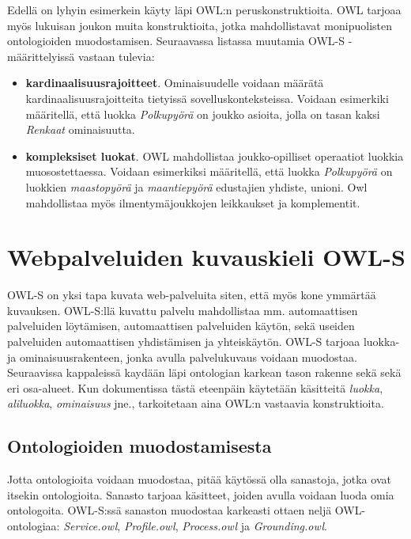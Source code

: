 \documentclass[finnish]{tktltiki2}
\theoremstyle{definition}
\theoremstyle{remark}
\begin{document}
Edellä on lyhyin esimerkein käyty läpi OWL:n peruskonstruktioita. OWL tarjoaa myös lukuisan joukon muita konstruktioita, jotka mahdollistavat monipuolisten ontologioiden muodostamisen. Seuraavassa listassa muutamia OWL-S -määrittelyissä vastaan tulevia:

\begin{itemize}
 \item \textbf{kardinaalisuusrajoitteet}. Ominaisuudelle voidaan määrätä kardinaalisuusrajoitteita tietyissä sovelluskonteksteissa. Voidaan esimerkiki määritellä, että luokka \textit{Polkupyörä} on joukko asioita, jolla on tasan kaksi \textit{Renkaat} ominaisuutta.
  \item \textbf{kompleksiset luokat}. OWL mahdollistaa joukko-opilliset operaatiot luokkia muosostettaessa. Voidaan esimerkiksi määritellä, että luokka \textit{Polkupyörä} on luokkien \textit{maastopyörä} ja \textit{maantiepyörä} edustajien yhdiste, unioni. Owl mahdollistaa myös ilmentymäjoukkojen leikkaukset ja komplementit. 
\end{itemize}

\section{Webpalveluiden kuvauskieli OWL-S}

OWL-S on yksi tapa kuvata web-palveluita siten, että myös kone ymmärtää kuvauksen\cite{OWLS}. OWL-S:llä kuvattu palvelu mahdollistaa mm. automaattisen palveluiden löytämisen, automaattisen palveluiden käytön, sekä useiden palveluiden automaattisen yhdistämisen ja yhteiskäytön\cite{OWLS}. OWL-S tarjoaa luokka- ja ominaisuusrakenteen, jonka avulla palvelukuvaus voidaan muodostaa. Seuraavissa kappaleissä kaydään läpi ontologian karkean tason rakenne sekä sekä eri osa-alueet. Kun dokumentissa tästä eteenpäin käytetään käsitteitä \textit{luokka}, \textit{aliluokka}, \textit{ominaisuus} jne., tarkoitetaan aina OWL:n vastaavia konstruktioita.

\subsection{Ontologioiden muodostamisesta}

Jotta ontologioita voidaan muodostaa, pitää käytössä olla sanastoja, jotka ovat itsekin ontologioita. Sanasto tarjoaa käsitteet, joiden avulla voidaan luoda omia ontologoita. OWL-S:ssä sanaston muodostaa karkeasti ottaen neljä OWL-ontologiaa: \textit{Service.owl}, \textit{Profile.owl}, \textit{Process.owl} ja \textit{Grounding.owl}. 
\end{document}
